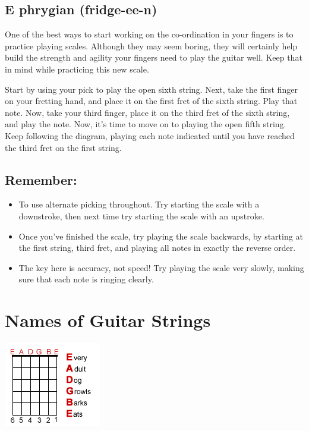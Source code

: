 \subsection{E phrygian (fridge-ee-n)}

One of the best ways to start working on the co-ordination in your fingers is
to practice playing scales. Although they may seem boring, they will certainly
help build the strength and agility your fingers need to play the guitar well.
Keep that in mind while practicing this new scale.

Start by using your pick to play the open sixth string. Next, take the first
finger on your fretting hand, and place it on the first fret of the sixth
string. Play that note. Now, take your third finger, place it on the third fret
of the sixth string, and play the note. Now, it's time to move on to playing
the open fifth string. Keep following the diagram, playing each note indicated
until you have reached the third fret on the first string.

\subsection{Remember:}
%
\begin{itemize}
\item To use alternate picking throughout. Try starting the scale with a
      downstroke, then next time try starting the scale with an upstroke.
\item Once you've finished the scale, try playing the scale backwards, by
      starting at the first string, third fret, and playing all notes in exactly the
      reverse order.
\item The key here is accuracy, not speed! Try playing the scale very slowly,
      making sure that each note is ringing clearly.
\end{itemize}

\section{Names of Guitar Strings}
\includegraphics{parttwo/openstrings.png}

